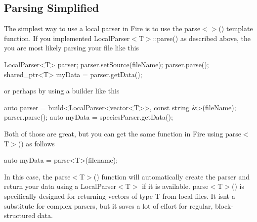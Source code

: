 \subsection*{Parsing Simplified}

The simplest way to use a local parser in Fire is to use the parse$<$$>$() template function. If you implemented Local\+Parser$<$T$>$\+::parse() as described above, the you are most likely parsing your file like this


\begin{DoxyCode}
LocalParser<T> parser;
parser.setSource(fileName);
parser.parse();
shared\_ptr<T> myData = parser.getData();
\end{DoxyCode}


or perhaps by using a builder like this


\begin{DoxyCode}
\textcolor{keyword}{auto} parser = build<LocalParser<vector<T>>, \textcolor{keyword}{const} \textcolor{keywordtype}{string} &>(fileName);
parser.parse();
\textcolor{keyword}{auto} myData = speciesParser.getData();
\end{DoxyCode}


Both of those are great, but you can get the same function in Fire using parse$<$T$>$() as follows


\begin{DoxyCode}
\textcolor{keyword}{auto} myData = parse<T>(filename);
\end{DoxyCode}


In this case, the parse$<$T$>$() function will automatically create the parser and return your data using a Local\+Parser$<$T$>$ if it is available. parse$<$T$>$() is specifically designed for returning vectors of type T from local files. It isn\textquotesingle{}t a substitute for complex parsers, but it saves a lot of effort for regular, block-\/structured data. 